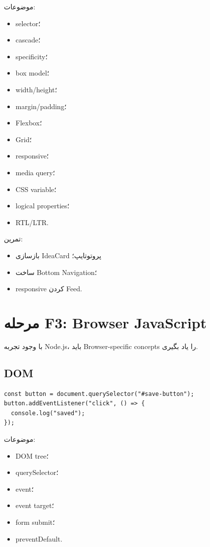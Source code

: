 موضوعات:
\begin{itemize}
  \item selector؛
  \item cascade؛
  \item specificity؛
  \item box model؛
  \item width/height؛
  \item margin/padding؛
  \item Flexbox؛
  \item Grid؛
  \item responsive؛
  \item media query؛
  \item CSS variable؛
  \item logical properties؛
  \item RTL/LTR.
\end{itemize}

تمرین:
\begin{itemize}
  \item بازسازی IdeaCard پروتوتایپ؛
  \item ساخت Bottom Navigation؛
  \item responsive کردن Feed.
\end{itemize}

\section{مرحله F3: Browser JavaScript}

با وجود تجربه Node.js، باید Browser-specific concepts را یاد بگیری.

\subsection{DOM}

\begin{latin}
\begin{lstlisting}
const button = document.querySelector("#save-button");
button.addEventListener("click", () => {
  console.log("saved");
});
\end{lstlisting}
\end{latin}

موضوعات:
\begin{itemize}
  \item DOM tree؛
  \item querySelector؛
  \item event؛
  \item event target؛
  \item form submit؛
  \item preventDefault.
\end{itemize}


